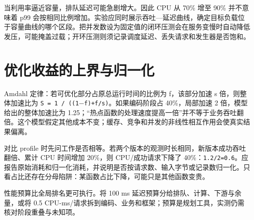 \documentclass[UTF8,fontset=fandol,openany,11pt]{ctexbook}
\begin{document}
当利用率逼近容量，排队延迟可能急剧增大。因此 CPU 从 70\% 增至 90\% 并不意味着 p99 会按相同比例增加。实验应同时展示吞吐—延迟曲线，确定目标负载位于容量曲线的哪个区段。把并发数设为固定值的闭环压测会在服务变慢时自动降低发压，可能掩盖过载；开环压测则须记录调度延迟、丢失请求和发生器是否饱和。

\section{优化收益的上界与归一化}
Amdahl 定律：若可优化部分占原总运行时间的比例为 f，该部分加速 s 倍，则整体加速比为 \texttt{S = 1 /\allowbreak{} ((1\ensuremath{-}f)+f/\allowbreak{}s)}。如果编码阶段占 40\%，局部加速 2 倍，模型给出的整体加速比为 1.25；“热点函数的处理速度提高一倍”并不等于业务吞吐翻倍。这个模型假定其他成本不变；缓存、竞争和并发的非线性相互作用会使真实结果偏离。

对比 profile 时先问工作是否相等。若两个版本的观测时长相同，新版本成功吞吐翻倍、累计 CPU 时间增加 20\%，则 CPU/成功请求下降了 40\%：\texttt{1.\allowbreak{}2/\allowbreak{}2=0.\allowbreak{}6}。应报告原始消耗和归一化消耗，并说明是否按请求数、输入字节或记录数归一化。只看占比还存在分母陷阱：某函数占比下降，可能只是其他函数变贵。

性能预算比全局排名更可执行。将 100 ms 延迟预算分给排队、计算、下游与余量，或将 0.5 CPU-ms/请求拆到编码、业务和框架；预算是规划工具，实测仍需核对阶段重叠与未知项。
\end{document}
